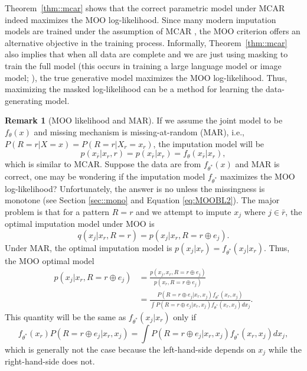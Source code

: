 \documentclass[aos, preprint]{imsart}
\theoremstyle{plain}
\theoremstyle{definition}
\newtheorem{remark}[theorem]{Remark}
\begin{document}
Theorem~\ref{thm::mcar} shows that the correct parametric model under MCAR indeed 
maximizes the MOO log-likelihood. 
Since many modern imputation models
are trained under the assumption of MCAR \citep{yoon2018gain},
the MOO criterion offers an alternative objective 
in the training process.
Informally, Theorem~\ref{thm::mcar} also implies that
when all data are complete and we are just using masking to 
train the full model (this occurs in training a large language model or image model; \citealt{devlin2019bert,vincent2010stacked}), 
the true generative model maximizes the MOO log-likelihood.
Thus, maximizing the masked log-likelihood can be a method for learning the data-generating model.



\begin{remark}[MOO likelihood and MAR]	\label{rm::mar}
If we assume the joint model to be $f_\theta(x)$ and missing mechanism is missing-at-random (MAR), i.e., $P(R=r|X=x)= P(R=r|X_r = x_r) $, 
the imputation model will be 
$$
p(x_{\bar r}|x_r, r)= p(x_{\bar r}|x_r) = f_\theta(x_{\bar r}|x_r),
$$
which is similar to MCAR.
Suppose the data are from $f_{\theta^*}(x)$ and MAR is correct,
one may be wondering if the imputation model $f_{\theta^*}$ maximizes  the MOO log-likelihood?
Unfortunately, the answer is no unless the missingness is monotone (see Section \ref{sec::mono} and Equation \eqref{eq:MOOBL2}).
The major problem is that for a pattern $R=r$ and we attempt to impute $x_j$ where $j \in \bar r$,
the optimal imputation model under MOO is 
$$
q(x_j|x_r, R=r) = p(x_j|x_r, R=r \oplus e_j).
$$
Under MAR, the optimal imputation model is $p(x_j|x_r) = f_{\theta^*}(x_j|x_r)$.
Thus, the MOO optimal model
\begin{align*}
p(x_j|x_r, R=r \oplus e_j) & = \frac{p(x_j,x_r, R=r \oplus e_j)}{p(x_r, R=r \oplus e_j)}\\
& = \frac{P(R=r\oplus e_j|x_r, x_j) f_{\theta^*}(x_r,x_j)}{\int  P(R=r\oplus e_j|x_r, x_j) f_{\theta^*}(x_r,x_j)dx_j}.
\end{align*}
This quantity will be the same as $f_{\theta^*}(x_j|x_r)$ only if 
$$
f_{\theta^*}(x_r) P(R=r\oplus e_j|x_r, x_j)  = \int  P(R=r\oplus e_j|x_r, x_j) f_{\theta^*}(x_r,x_j)dx_j,
$$
which is generally not the case because the left-hand-side depends on $x_j$ while the right-hand-side does not. 
\end{remark}
\end{document}
